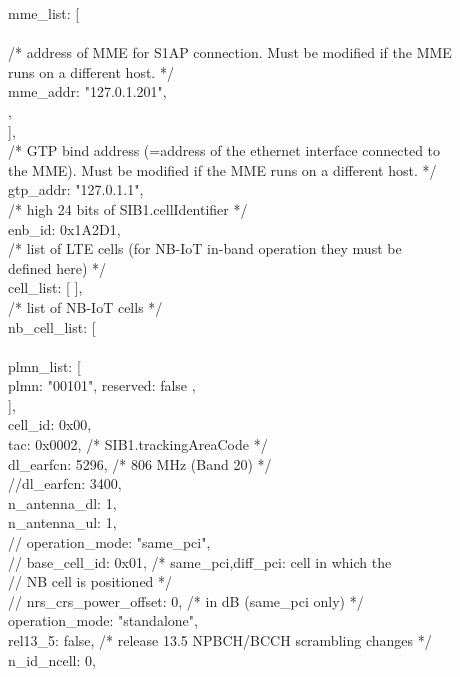{  mme\_list: [ \\
    { \\
      /* address of MME for S1AP connection. Must be modified if the MME\\
         runs on a different host. */\\
      mme\_addr: "127.0.1.201",\\
    },\\
  ],\\
  /* GTP bind address (=address of the ethernet interface connected to\\
     the MME). Must be modified if the MME runs on a different host. */\\
  gtp\_addr: "127.0.1.1",\\

  /* high 24 bits of SIB1.cellIdentifier */\\
  enb\_id: 0x1A2D1,\\

  /* list of LTE cells (for NB-IoT in-band operation they must be\\
     defined here) */\\
  cell\_list: [ ],\\
  
  /* list of NB-IoT cells */\\
  nb\_cell\_list: [\\
    {\\
      plmn\_list: [\\
        { plmn: "00101", reserved: false },\\
      ],\\
      cell\_id: 0x00,\\
      tac: 0x0002, /* SIB1.trackingAreaCode */\\
      dl\_earfcn:  5296, /* 806 MHz (Band 20) */\\
      //dl\_earfcn: 3400,\\
      n\_antenna\_dl: 1,\\
      n\_antenna\_ul: 1,\\
//      operation\_mode: "same\_pci",\\
//      base\_cell\_id: 0x01, /* same\_pci,diff\_pci: cell in which the\\
//                             NB cell is positioned */\\
//      nrs\_crs\_power\_offset: 0, /* in dB (same\_pci only) */\\
      operation\_mode: "standalone",\\
      rel13\_5: false, /* release 13.5 NPBCH/BCCH scrambling changes */\\
      n\_id\_ncell: 0,\\

}}
